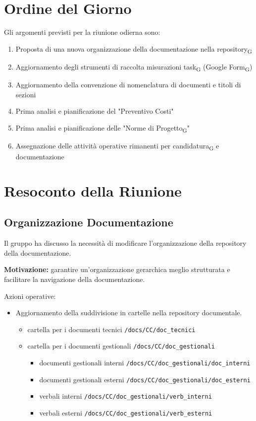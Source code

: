 \section{Ordine del Giorno}
Gli argomenti previsti per la riunione odierna sono:
\begin{enumerate}
    \item Proposta di una nuova organizzazione della documentazione nella repository\textsubscript{G}
    \item Aggiornamento degli strumenti di raccolta misurazioni task\textsubscript{G} (Google Form\textsubscript{G})
    \item Aggiornamento della convenzione di nomenclatura di documenti e titoli di sezioni
    \item Prima analisi e pianificazione del "Preventivo Costi"
    \item Prima analisi e pianificazione delle "Norme di Progetto\textsubscript{G}"
    \item Assegnazione delle attività operative rimanenti per candidatura\textsubscript{G} e documentazione
\end{enumerate}

\section{Resoconto della Riunione}

\subsection{Organizzazione Documentazione}
Il gruppo ha discusso la necessità di modificare l'organizzazione della repository della documentazione.

\textbf{Motivazione:} garantire un'organizzazione gerarchica meglio strutturata e facilitare la navigazione della documentazione.

Azioni operative:
\begin{itemize}
    \item Aggiornamento della suddivisione in cartelle nella repository documentale.
    \begin{itemize}
        \item cartella per i documenti tecnici \texttt{/docs/CC/doc\_tecnici}
        \item cartella per i documenti gestionali \texttt{/docs/CC/doc\_gestionali}
        \begin{itemize}
            \item documenti gestionali interni \texttt{/docs/CC/doc\_gestionali/doc\_interni}
            \item documenti gestionali esterni \texttt{/docs/CC/doc\_gestionali/doc\_esterni}
            \item verbali interni \texttt{/docs/CC/doc\_gestionali/verb\_interni}
            \item verbali esterni \texttt{/docs/CC/doc\_gestionali/verb\_esterni}
        \end{itemize}
    \end{itemize}
\end{itemize}

